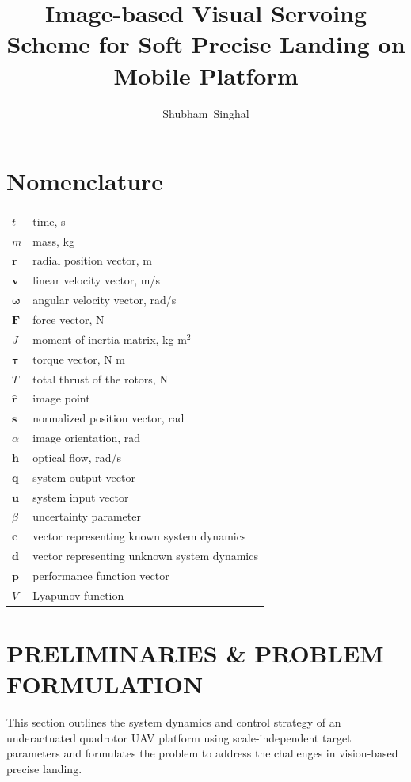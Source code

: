 \documentclass[lettersize,journal]{IEEEtran}
\begin{document}
\title{Image-based Visual Servoing Scheme for Soft Precise Landing on Mobile Platform}

\author{Shubham~Singhal}


\maketitle
\section*{Nomenclature}

\begin{tabular}{@{}l @{\quad=\quad} l@{}}
$t$ & time, s \\
$m$ & mass, kg \\
$\boldsymbol{r}$ & radial position vector, m \\
$\boldsymbol{v}$ & linear velocity vector, m/s \\
$\boldsymbol{\omega}$ & angular velocity vector, rad/s \\
$\boldsymbol{F}$ & force vector, N \\
$J$ & moment of inertia matrix, kg m$^2$ \\
$\boldsymbol{\tau}$ & torque vector, N m \\
$T$ & total thrust of the rotors, N \\
$\hat{\boldsymbol{r}}$ & image point \\
$\boldsymbol{s}$ & normalized position vector, rad \\
$\alpha$ & image orientation, rad \\
$\boldsymbol{h}$ & optical flow, rad/s \\
$\boldsymbol{q}$ & system output vector \\
$\boldsymbol{u}$ & system input vector \\
$\beta$ & uncertainty parameter \\
$\boldsymbol{c}$ & vector representing known system dynamics \\
$\boldsymbol{d}$ & vector representing unknown system dynamics \\
$\boldsymbol{p}$ & performance function vector \\
$V$ & Lyapunov function
\end{tabular}

\section{PRELIMINARIES \& PROBLEM FORMULATION} \label{background: section}
This section outlines the system dynamics and control strategy of an underactuated quadrotor UAV platform using scale-independent target parameters and formulates the problem to address the challenges in vision-based precise landing.
\end{document}
